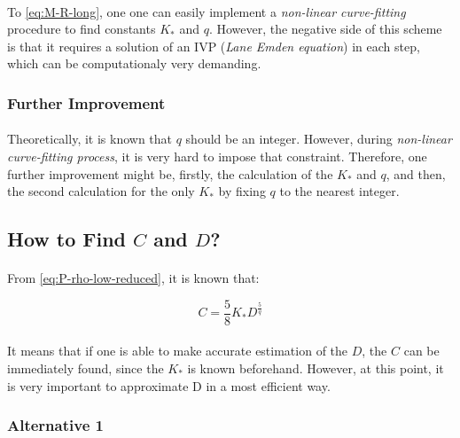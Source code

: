 \documentclass[letterpaper,12pt]{article}
\begin{document}
\paragraph{} To \eqref{eq:M-R-long}, one one can easily implement a \textit{non-linear curve-fitting} procedure to find constants $K_*$ and $q$. However, the negative side of this scheme is that it requires a solution of an IVP (\textit{Lane Emden equation}) in each step, which can be computationaly very demanding.

\subsubsection{Further Improvement}
\label{sec:Kq_fit_f}

\paragraph{} Theoretically, it is known that $q$ should be an integer. However, during \textit{non-linear curve-fitting process}, it is very hard to impose that constraint. Therefore, one further improvement might be, firstly, the calculation of the $K_*$ and $q$, and then, the second calculation for the only $K_*$ by fixing $q$ to the nearest integer.  


\subsection{How to Find $C$ and $D$?}
\label{sec:D_fit}
\paragraph{} From \eqref{eq:P-rho-low-reduced}, it is known that:

\begin{equation*}
    C = \frac{5}{8}K_* D^{\frac{5}{q}}
\end{equation*}

\paragraph{} It means that if one is able to make accurate estimation of the $D$, the $C$ can be immediately found, since the $K_*$ is known beforehand. However, at this point, it is very important to approximate D in a most efficient way. 

\subsubsection{Alternative 1}
\label{sec:D_fit_a1}
\end{document}

